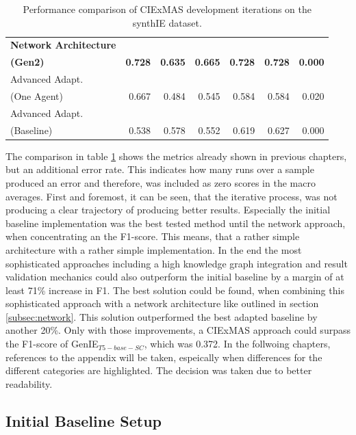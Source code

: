 \documentclass[a4paper,oneside,bibliography=totoc]{scrbook}
\begin{document}
\begin{table}[h]
\begin{tabular}{p{5cm}|rrrrrr}
    \textbf{Network Architecture}                                                                                           \\\textbf{(Gen2)} & \textbf{0.728} & \textbf{0.635} & \textbf{0.665} & \textbf{0.728} & \textbf{0.728} & \textbf{0.000} \\
    Advanced Adapt.                                                                                                         \\(One Agent) & 0.667 & 0.484 & 0.545 & 0.584 & 0.584 & 0.020 \\
    Advanced Adapt.                                                                                                         \\(Baseline) & 0.538 & 0.578 & 0.552 & 0.619 & 0.627 & 0.000 \\
    \bottomrule
  \end{tabular}
  \caption{Performance comparison of CIExMAS development iterations on the synthIE dataset.}
  \label{tab:evaluation_iterations}
\end{table}

The comparison in table \ref{tab:evaluation_iterations} shows the metrics already shown in previous chapters, but an additional error rate. This indicates how many runs over a sample produced an error and therefore, was included as zero scores in the macro averages. First and foremost, it can be seen, that the iterative process, was not producing a clear trajectory of producing better results. Especially the initial baseline implementation was the best tested method until the network approach, when concentrating an the F1-score. This means, that a rather simple architecture with a rather simple implementation.
In the end the most sophisticated approaches including a high knowledge graph integration and result validation mechanics could also outperform the initial baseline by a margin of at least 71\% increase in F1. The best solution could be found, when combining this sophisticated approach with a network architecture like outlined in section \ref{subsec:network}. This solution outperformed the best adapted baseline by another 20\%. Only with those improvements, a CIExMAS approach could surpass the F1-score of GenIE$_{T5-base-SC}$, which was 0.372. In the follwoing chapters, references to the appendix will be taken, espeically when differences for the different categories are highlighted. The decision was taken due to better readability.

\subsection{Initial Baseline Setup}
\label{subsec:initial_baseline_setup}
\end{document}
